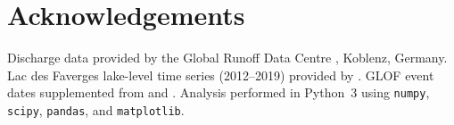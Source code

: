 \section*{Acknowledgements}

Discharge data provided by the Global Runoff Data Centre \citep{GRDC2026}, Koblenz, Germany.
Lac des Faverges lake-level time series (2012--2019) provided by \citet{Ogier2021}.
GLOF event dates supplemented from \citet{GletsscherseeL2026} and \citet{Simmentalzeitung2026}.
Analysis performed in Python~3 using \texttt{numpy}, \texttt{scipy}, \texttt{pandas},
and \texttt{matplotlib}.
